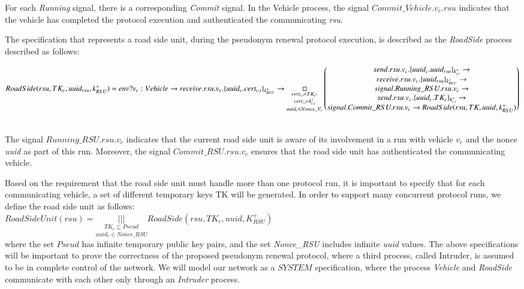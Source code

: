 \documentclass[preprint,12pt]{elsarticle}
\begin{document}
For each \textit{Running} signal, there is a corresponding \textit{Commit} signal. In the Vehicle process, the signal $Commit\_Vehicle.v_c.rsu$ indicates that the vehicle has completed the protocol execution and authenticated the communicating \textit{rsu}.

The specification that represents a road side unit, during the pseudonym renewal protocol execution, is described as the \textit{RoadSide} process described as follows: 
\\
\vspace{0,5cm}
\small{
\parbox[t]{1.2\textwidth}{$RoadSide(rsu, TK_c, uuid_{rsu}, k^{+}_{RSU}) = \\
env?v_c:Vehicle \rightarrow  receive.rsu.v_c.\{uuid_c.cert_{c, i}\}_{k^{+}_{RSU}} \rightarrow \\
  \underset{uuid_{c} \in Nonce\_{V_c}}{\underset{cert_{c, i} \vdash k^{+}_{c,i}}{\underset{ cert_{c, i} \in TK_{c'} }{\Box}}}
  \begin{pmatrix}
    send.rsu.v_c.\{uuid_c.uuid_{rsu}\}_{k^{+}_{c, i}} \rightarrow \\
    receive.rsu.v_c.\{ uuid_{rsu}\}_{k^{+}_{RSU}} \rightarrow \\
    signal.Running\_RSU.rsu.v_c \rightarrow \\
    send.rsu.v_c.\{ uuid_c.TK_c\}_{k^{+}_{c, i}} \rightarrow \\
    signal.Commit\_RSU.rsu.v_c \rightarrow RoadSide(rsu, TK, uuid, k^{+}_{RSU})
  \end{pmatrix}
$}}
\\
The signal $Running\_RSU.rsu.v_c$ indicates that the current road side unit is aware of its involvement in a run with vehicle $v_{c}$ and the nonce \textit{uuid} as part of this run. Moreover, the signal $Commit\_RSU.rsu.v_c$ ensures that the road side unit has authenticated the communicating vehicle.

Based on the requirement that the road side unit must handle more than one protocol run, it is important to specify that for each communicating vehicle, a set of different temporary keys TK will be generated. In order to support many concurrent protocol runs, we define the road side unit as follows:
\\

$RoadSideUnit(rsu) = \underset{uuid_r \in Nonce\_RSU}{\underset{TK_c \subseteq Pseud}{|||}} RoadSide(rsu, TK_c, uuid, K^{+}_{RSU})$
\\


\noindent where the set $Pseud$ has infinite temporary public key pairs, and the set \textit{Nonce\_RSU} includes infinite \textit{uuid} values. The above specifications will be important to prove the correctness of the proposed pseudonym renewal protocol, where a third process, called Intruder, is assumed to be in complete control of the network. We will model our network as a $SYSTEM$ specification, where the process \textit{Vehicle} and \textit{RoadSide} communicate with each other only through an \textit{Intruder} process.
\end{document}
